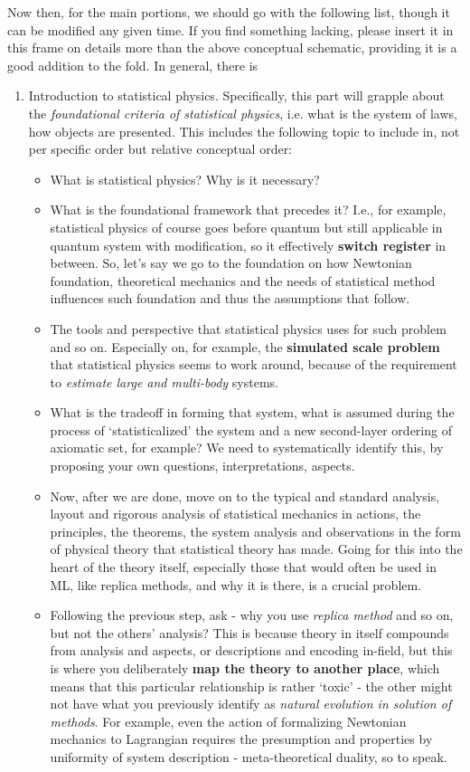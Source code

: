 Now then, for the main portions, we should go with the following list, though it can be modified any given time. If you find something lacking, please insert it in this frame on details more than the above conceptual schematic, providing it is a good addition to the fold. In general, there is
\begin{enumerate}[topsep=1pt,itemsep=1pt]
    \item Introduction to statistical physics. Specifically, this part will grapple about the \textit{foundational criteria of statistical physics}, i.e. what is the system of laws, how objects are presented. This includes the following topic to include in, not per specific order but relative conceptual order:
    \begin{itemize}[topsep=1pt,itemsep=1pt]
        \item What is statistical physics? Why is it necessary?
        \item What is the foundational framework that precedes it? I.e., for example, statistical physics of course goes before quantum but still applicable in quantum system with modification, so it effectively \textbf{switch register} in between. So, let's say we go to the foundation on how Newtonian foundation, theoretical mechanics and the needs of statistical method influences such foundation and thus the assumptions that follow. 
        \item The tools and perspective that statistical physics uses for such problem and so on. Especially on, for example, the \textbf{simulated scale problem} that statistical physics seems to work around, because of the requirement to \textit{estimate large and multi-body} systems.  
        \item What is the tradeoff in forming that system, what is assumed during the process of `statisticalized' the system and a new second-layer ordering of axiomatic set, for example? We need to systematically identify this, by proposing your own questions, interpretations, aspects. 
        \item Now, after we are done, move on to the typical and standard analysis, layout and rigorous analysis of statistical mechanics in actions, the principles, the theorems, the system analysis and observations in the form of physical theory that statistical theory has made. Going for this into the heart of the theory itself, especially those that would often be used in ML, like replica methods, and why it is there, is a crucial problem. 
        \item Following the previous step, ask - why you use \textit{replica method} and so on, but not the others' analysis? This is because theory in itself compounds from analysis and aspects, or descriptions and encoding in-field, but this is where you deliberately \textbf{map the theory to another place}, which means that this particular relationship is rather `toxic' - the other might not have what you previously identify as \textit{natural evolution in solution of methods}. For example, even the action of formalizing Newtonian mechanics to Lagrangian requires the presumption and properties by uniformity of system description - meta-theoretical duality, so to speak.  

\end{itemize}
\end{enumerate}
